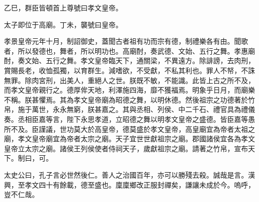 乙巳，群臣皆頓首上尊號曰孝文皇帝。

太子即位于高廟。丁未，襲號曰皇帝。

孝景皇帝元年十月，制詔御史，蓋聞古者祖有功而宗有德，制禮樂各有由。聞歌者，所以發德也，舞者，所以明功也。高廟酎，奏武德、文始、五行之舞。孝惠廟酎，奏文始、五行之舞。孝文皇帝臨天下，通關梁，不異遠方。除誹謗，去肉刑，賞賜長老，收恤孤獨，以育群生。減嗜欲，不受獻，不私其利也。罪人不帑，不誅無罪。除肉宮刑，出美人，重絕人之世。朕既不敏，不能識。此皆上古之所不及，而孝文皇帝親行之。德厚侔天地，利澤施四海，靡不獲福焉。明象乎日月，而廟樂不稱。朕甚懼焉。其為孝文皇帝廟為昭德之舞，以明休德。然後祖宗之功德著於竹帛，施于萬世，永永無窮，朕甚嘉之。其與丞相、列侯、中二千石、禮官具為禮儀奏。丞相臣嘉等言，陛下永思孝道，立昭德之舞以明孝文皇帝之盛德。皆臣嘉等愚所不及。臣謹議，世功莫大於高皇帝，德莫盛於孝文皇帝，高皇廟宜為帝者太祖之廟，孝文皇帝廟宜為帝者太宗之廟。天子宜世世獻祖宗之廟。郡國諸侯宜各為孝文皇帝立太宗之廟。諸侯王列侯使者侍祠天子，歲獻祖宗之廟。請著之竹帛，宣布天下。制曰，可。

太史公曰，孔子言必世然後仁。善人之治國百年，亦可以勝殘去殺。誠哉是言。漢興，至孝文四十有餘載，德至盛也。廩廩鄉改正服封禪矣，謙讓未成於今。嗚呼，豈不仁哉。